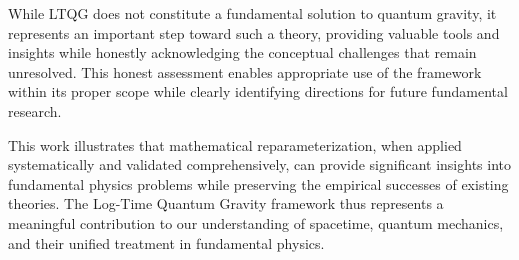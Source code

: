 While LTQG does not constitute a fundamental solution to quantum gravity, it represents an important step toward such a theory, providing valuable tools and insights while honestly acknowledging the conceptual challenges that remain unresolved. This honest assessment enables appropriate use of the framework within its proper scope while clearly identifying directions for future fundamental research.

This work illustrates that mathematical reparameterization, when applied systematically and validated comprehensively, can provide significant insights into fundamental physics problems while preserving the empirical successes of existing theories. The Log-Time Quantum Gravity framework thus represents a meaningful contribution to our understanding of spacetime, quantum mechanics, and their unified treatment in fundamental physics.